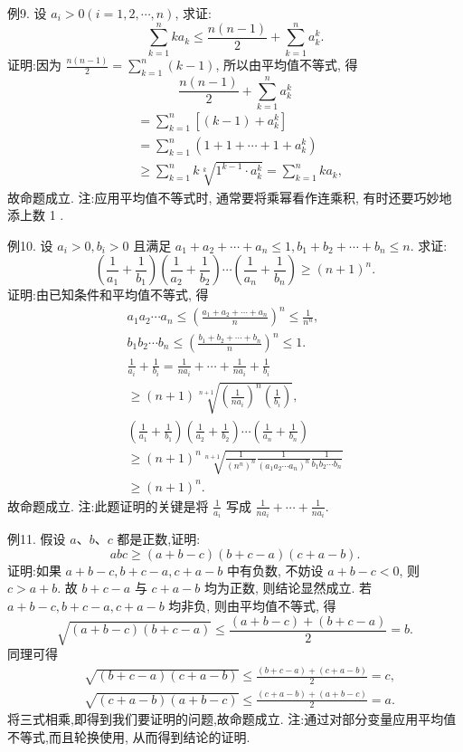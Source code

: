 例9. 设 $a_i>0(i=1,2, \cdots, n)$, 求证:
$$
\sum_{k=1}^n k a_k \leqslant \frac{n(n-1)}{2}+\sum_{k=1}^n a_k^k .
$$
证明:因为 $\frac{n(n-1)}{2}=\sum_{k=1}^n(k-1)$, 所以由平均值不等式, 得
$$
\frac{n(n-1)}{2}+\sum_{k=1}^n a_k^k
$$
$$
\begin{aligned}
& =\sum_{k=1}^n\left[(k-1)+a_k^k\right] \\
& =\sum_{k=1}^n\left(1+1+\cdots+1+a_k^k\right) \\
& \geqslant \sum_{k=1}^n k \sqrt[k]{1^{k-1} \cdot a_k^k}=\sum_{k=1}^n k a_k,
\end{aligned}
$$
故命题成立.
注:应用平均值不等式时, 通常要将乘幂看作连乘积, 有时还要巧妙地添上数 1 .



例10. 设 $a_i>0, b_i>0$ 且满足 $a_1+a_2+\cdots+a_n \leqslant 1, b_1+b_2+\cdots+ b_n \leqslant n$. 求证:
$$
\left(\frac{1}{a_1}+\frac{1}{b_1}\right)\left(\frac{1}{a_2}+\frac{1}{b_2}\right) \cdots\left(\frac{1}{a_n}+\frac{1}{b_n}\right) \geqslant(n+1)^n .
$$
证明:由已知条件和平均值不等式, 得
$$
\begin{gathered}
a_1 a_2 \cdots a_n \leqslant\left(\frac{a_1+a_2+\cdots+a_n}{n}\right)^n \leqslant \frac{1}{n^n}, \\
b_1 b_2 \cdots b_n \leqslant\left(\frac{b_1+b_2+\cdots+b_n}{n}\right)^n \leqslant 1 . \\
\frac{1}{a_i}+\frac{1}{b_i}=\frac{1}{n a_i}+\cdots+\frac{1}{n a_i}+\frac{1}{b_i} \\
\geqslant(n+1) \sqrt[n+1]{\left(\frac{1}{n a_i}\right)^n\left(\frac{1}{b_i}\right)}, \\
\left(\frac{1}{a_1}+\frac{1}{b_1}\right)\left(\frac{1}{a_2}+\frac{1}{b_2}\right) \cdots\left(\frac{1}{a_n}+\frac{1}{b_n}\right) \\
\geqslant(n+1)^n \sqrt[n+1]{\frac{1}{\left(n^n\right)^n} \frac{1}{\left(a_1 a_2 \cdots a_n\right)^n} \frac{1}{b_1 b_2 \cdots b_n}} \\
\geqslant(n+1)^n .
\end{gathered}
$$
故命题成立.
注:此题证明的关键是将 $\frac{1}{a_i}$ 写成 $\frac{1}{n a_i}+\cdots+\frac{1}{n a_i}$.



例11. 假设 $a 、 b 、 c$ 都是正数,证明:
$$
a b c \geqslant(a+b-c)(b+c-a)(c+a-b) .
$$
证明:如果 $a+b-c, b+c-a, c+a-b$ 中有负数, 不妨设 $a+b-c<0$,
则 $c>a+b$. 故 $b+c-a$ 与 $c+a-b$ 均为正数, 则结论显然成立.
若 $a+b-c, b+c-a, c+a-b$ 均非负, 则由平均值不等式, 得
$$
\sqrt{(a+b-c)(b+c-a)} \leqslant \frac{(a+b-c)+(b+c-a)}{2}=b .
$$
同理可得
$$
\begin{aligned}
& \sqrt{(b+c-a)(c+a-b)} \leqslant \frac{(b+c-a)+(c+a-b)}{2}=c, \\
& \sqrt{(c+a-b)(a+b-c)} \leqslant \frac{(c+a-b)+(a+b-c)}{2}=a .
\end{aligned}
$$
将三式相乘,即得到我们要证明的问题,故命题成立.
注:通过对部分变量应用平均值不等式,而且轮换使用, 从而得到结论的证明.



